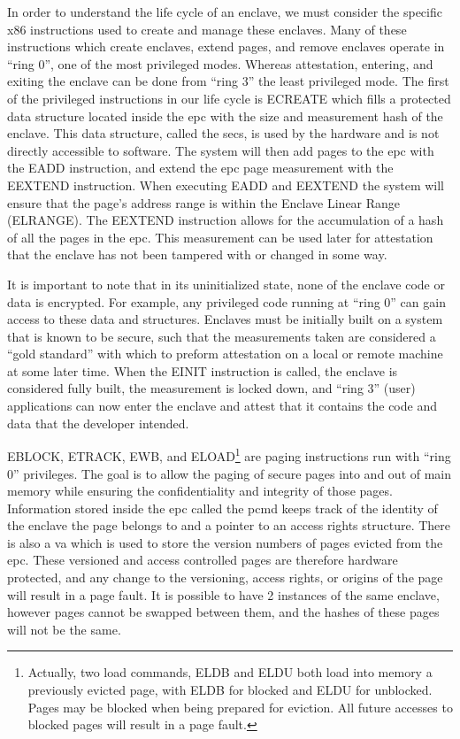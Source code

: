 In order to understand the life cycle of an enclave, we must consider the specific x86 instructions used to create and manage these enclaves. Many of these instructions which create enclaves, extend pages, and remove enclaves operate in ``\gls{ring} 0'', one of the most privileged modes. Whereas \gls{attestation}, entering, and exiting the enclave can be done from ``\gls{ring} 3'' the least privileged mode. The first of the privileged instructions in our life cycle is ECREATE which fills a protected data structure located inside the \gls{epc} with the size and \gls{measurement} hash of the enclave. This data structure, called the \gls{secs}, is used by the hardware and is not directly accessible to software. The system will then add pages to the \gls{epc} with the EADD instruction, and extend the \gls{epc} page \gls{measurement} with the EEXTEND instruction. When executing EADD and EEXTEND the system will ensure that the page's address range is within the Enclave Linear Range (ELRANGE). The EEXTEND instruction allows for the accumulation of a hash of all the pages in the \gls{epc}. This \gls{measurement} can be used later for \gls{attestation} that the enclave has not been tampered with or changed in some way.

It is important to note that in its uninitialized state, none of the enclave code or data is encrypted. For example, any privileged code running at ``\gls{ring} 0'' can gain access to these data and structures. Enclaves must be initially built on a system that is known to be secure, such that the \glspl{measurement} taken are considered a ``gold standard'' with which to preform \gls{attestation} on a local or remote machine at some later time. When the EINIT instruction is called, the enclave is considered fully built, the \gls{measurement} is locked down, and ``\gls{ring} 3'' (user) applications can now enter the enclave and attest that it contains the code and data that the developer intended. 

EBLOCK, ETRACK, EWB, and ELOAD\footnote{Actually, two load commands, ELDB and ELDU both load into memory a previously evicted page, with ELDB for blocked and ELDU for unblocked. Pages may be blocked when being prepared for eviction. All future accesses to blocked pages will result in a page fault.} are paging instructions run with ``\gls{ring} 0'' privileges. The goal is to allow the paging of secure pages into and out of main memory while ensuring the confidentiality and integrity of those pages. Information stored inside the \gls{epc} called the \gls{pcmd} keeps track of the identity of the enclave the page belongs to and a pointer to an access rights structure. There is also a \gls{va} which is used to store the version numbers of pages evicted from the \gls{epc}. These versioned and access controlled pages are therefore hardware protected, and any change to the versioning, access rights, or origins of the page will result in a page fault. It is possible to have 2 instances of the same enclave, however pages cannot be swapped between them, and the hashes of these pages will not be the same.

